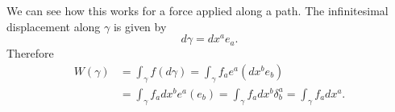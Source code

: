 \documentclass[10pt,twocolumn, nofootinbib]{revtex4-2}
\begin{document}










We can see how this works for a force applied along a path. The infinitesimal displacement along $\gamma$ is given by
\begin{equation*}
	d\gamma = dx^a e_a.
\end{equation*}
Therefore 
\begin{equation*}
	\begin{aligned}
		W(\gamma) &= \int_\gamma f(d\gamma) = \int_\gamma  f_a e^a(dx^b e_b) \\
		&= \int_\gamma  f_a dx^b e^a( e_b)
		= \int_\gamma  f_a dx^b \delta^a_b
		= \int_\gamma  f_a dx^a.
	\end{aligned}
\end{equation*}
\end{document}
